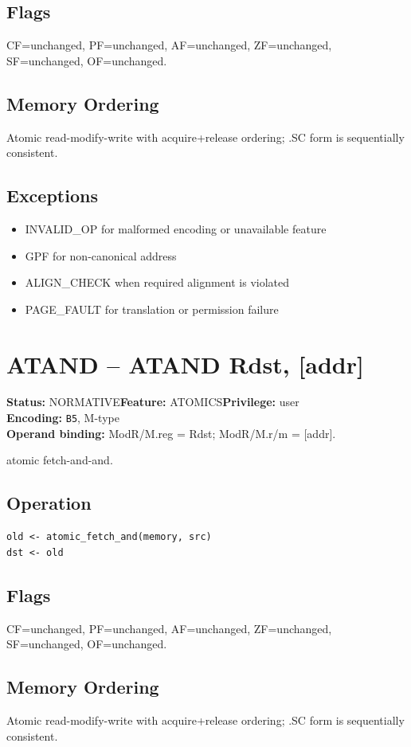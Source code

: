 \documentclass[10pt]{article}
\begin{document}
\subsection*{Flags}
CF=unchanged, PF=unchanged, AF=unchanged, ZF=unchanged, SF=unchanged, OF=unchanged.
\subsection*{Memory Ordering}
Atomic read-modify-write with acquire+release ordering; .SC form is sequentially consistent.
\subsection*{Exceptions}
\begin{itemize}
\item INVALID\_OP for malformed encoding or unavailable feature
\item GPF for non-canonical address
\item ALIGN\_CHECK when required alignment is violated
\item PAGE\_FAULT for translation or permission failure
\end{itemize}
\clearpage

\section{ATAND -- ATAND Rdst, [addr]}
\textbf{Status:} NORMATIVE\quad \textbf{Feature:} ATOMICS\quad \textbf{Privilege:} user\\
\textbf{Encoding:} \texttt{B5}, M-type\\
\textbf{Operand binding:} ModR/M.reg = Rdst; ModR/M.r/m = [addr].

atomic fetch-and-and.

\subsection*{Operation}
\begin{lstlisting}
old <- atomic_fetch_and(memory, src)
dst <- old
\end{lstlisting}
\subsection*{Flags}
CF=unchanged, PF=unchanged, AF=unchanged, ZF=unchanged, SF=unchanged, OF=unchanged.
\subsection*{Memory Ordering}
Atomic read-modify-write with acquire+release ordering; .SC form is sequentially consistent.
\end{document}
